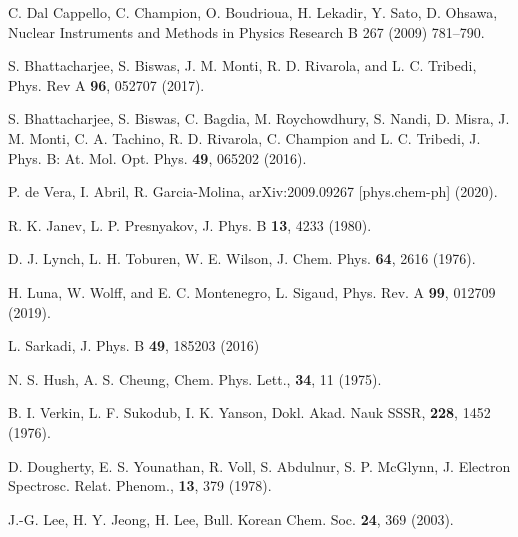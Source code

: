 \begin{thebibliography}{9}
C. Dal Cappello, C. Champion, O. Boudrioua, H. Lekadir, Y. Sato, 
D. Ohsawa, 
Nuclear Instruments and Methods in Physics Research B 267 (2009) 781--790.

S. Bhattacharjee, S. Biswas, J. M. Monti, R. D. Rivarola, and 
L. C. Tribedi,
Phys. Rev A \textbf{96}, 052707 (2017).

S. Bhattacharjee, S. Biswas, C. Bagdia, M. Roychowdhury, S. Nandi, 
D. Misra, J. M. Monti, C. A. Tachino, R. D. Rivarola, C. Champion and 
L. C. Tribedi, J. 
Phys. B: At. Mol. Opt. Phys. \textbf{49},  065202 (2016).

P. de Vera, I. Abril, R. Garcia-Molina,
arXiv:2009.09267 [phys.chem-ph] (2020).


R. K. Janev, L. P. Presnyakov, 
J. Phys. B \textbf{13}, 4233 (1980).

D. J. Lynch, L. H. Toburen, W. E. Wilson,
J. Chem. Phys. \textbf{64}, 2616 (1976).

H. Luna, W. Wolff, and E. C. Montenegro, L. Sigaud, 
Phys. Rev. A \textbf{99}, 012709 (2019).

L. Sarkadi, 
J. Phys. B \textbf{49}, 185203 (2016)

N. S. Hush, A. S. Cheung,  
Chem. Phys. Lett., \textbf{34}, 11 (1975).

B. I. Verkin, L. F. Sukodub, I. K. Yanson, 
Dokl. Akad. Nauk SSSR, \textbf{228}, 1452 (1976).

D. Dougherty, E. S. Younathan, R. Voll, S. Abdulnur, S. P. McGlynn,
J. Electron Spectrosc. Relat. Phenom., \textbf{13}, 379 (1978).

J.-G. Lee, H. Y. Jeong, H. Lee, 
Bull. Korean Chem. Soc. \textbf{24}, 369 (2003).


\end{thebibliography}
